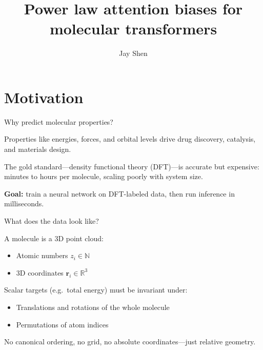 \documentclass{beamer}
\title[Power law attention biases]{Power law attention biases for molecular transformers}
\author{Jay Shen}
\begin{document}
\begin{frame}
    \titlepage
\end{frame}

\section{Motivation}

\begin{frame}{Why predict molecular properties?}

Properties like energies, forces, and orbital levels drive drug discovery, catalysis, and materials design.

\vspace{1em}

The gold standard---density functional theory (DFT)---is accurate but expensive: minutes to hours per molecule, scaling poorly with system size.

\vspace{1em}

\textbf{Goal:} train a neural network on DFT-labeled data, then run inference in milliseconds. 

\end{frame}

\begin{frame}{What does the data look like?}

A molecule is a 3D point cloud:
\begin{itemize}
    \item Atomic numbers $z_i \in \mathbb{N}$
    \item 3D coordinates $\mathbf{r}_i \in \mathbb{R}^3$
\end{itemize}

\vspace{1em}

Scalar targets (e.g.\ total energy) must be invariant under:
\begin{itemize}
    \item Translations and rotations of the whole molecule
    \item Permutations of atom indices
\end{itemize}

\vspace{1em}

No canonical ordering, no grid, no absolute coordinates---just relative geometry.

\end{frame}
\end{document}
